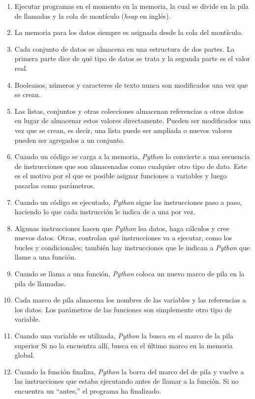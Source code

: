\begin{enumerate}

\item
Ejecutar programas en el momento en la memoria,
la cual se divide en la pila de llamadas y la cola de montículo (\emph{heap} en inglés).

\item
  La memoria para los datos siempre es asignada desde la cola del montículo. 

\item
Cada conjunto de datos se almacena en una estructura de dos partes.
La primera parte dice de qué tipo de datos se trata
y la segunda parte es el valor real.

\item
Booleanos, números y caracteres de texto nunca son modificados una vez que se crean. 

\item
Las listas, conjuntos y otras colecciones almacenan referencias a otros datos
en lugar de almacenar estos valores directamente.
Pueden ser modificados una vez que se crean,
es decir, una lista puede ser ampliada o nuevos valores pueden ser agregados a un conjunto.
  
\item
Cuando un código se carga a la memoria,
\emph{Python} lo convierte a una secuencia de instrucciones
que son almacenadas como cualquier otro tipo de dato.
Este es el motivo por el que es posible asignar funciones a variables
y luego pasarlas como parámetros.

\item
Cuando un código es ejecutado,
\emph{Python} sigue las instrucciones paso a paso,
haciendo lo que cada instrucción le indica de a una por vez.

\item
Algunas instrucciones hacen que \emph{Python} lea datos,
haga cálculos
y cree nuevos datos.
Otras, controlan qué instrucciones va a ejecutar,
como los bucles y condicionales; también hay instrucciones que  
le indican a \emph{Python} que llame a una función.

\item
  Cuando se llama a una función,
\emph{Python} coloca un nuevo marco de pila en la pila de llamadas.

\item
Cada marco de pila almacena los nombres de las variables y las referencias a los datos.
Los parámetros de las funciones son simplemente otro tipo de variable.

\item
Cuando una variable es utilizada,
\emph{Python} la busca en el marco de la pila superior
Si no la encuentra allí, busca en el último marco en la memoria global.
 
\item
Cuando la función finaliza, 
\emph{Python} la borra del marco del de pila y vuelve
a las instrucciones que estaba ejecutando antes de llamar a la función.
Si no encuentra un ``antes,''
  el programa ha finalizado.

\end{enumerate}

